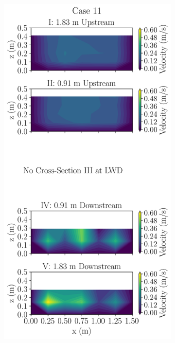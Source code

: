 \documentclass[preview, border=2pt]{standalone}
\begin{document}
\begin{figure}
\begin{subfigure}[b]{0.24\textwidth}
     \end{subfigure}
     \hfill     
     \begin{subfigure}[b]{0.24\textwidth}
         \centering
         \caption{}
         \includegraphics[width=\textwidth]{Case11_velocity_contours.png}

\end{subfigure}
\end{figure}
\end{document}
